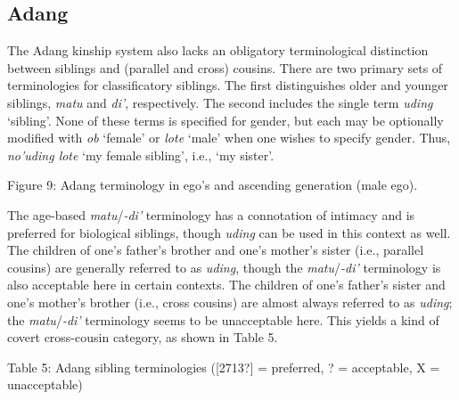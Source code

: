 \subsection[Adang]{Adang}
\hypertarget{RefHeading78025871885726}{}The Adang kinship system also lacks an obligatory terminological distinction between siblings and (parallel and cross) cousins. There are two primary sets of terminologies for classificatory siblings. The first distinguishes older and younger siblings, \textit{matu }and \textit{di{\textquoteright}}, respectively. The second includes the single term \textit{uding }{\textquoteleft}sibling{\textquoteright}. None of these terms is specified for gender, but each may be optionally modified with \textit{ob }{\textquoteleft}female{\textquoteright} or \textit{lote }{\textquoteleft}male{\textquoteright} when one wishes to specify gender. Thus, \textit{no{\textquoteright}uding lote} {\textquoteleft}my female sibling{\textquoteright}, i.e., {\textquoteleft}my sister{\textquoteright}. 

{\centering
Figure 9: Adang terminology in ego{\textquoteright}s and ascending generation (male ego). 
\par}

{%
 \par}

The age-based \textit{matu}/\textit{{}-di{\textquoteright} }terminology has a connotation of intimacy and is preferred for biological siblings, though \textit{uding }can be used in this context as well. The children of one{\textquoteright}s father{\textquoteright}s brother and one{\textquoteright}s mother{\textquoteright}s sister (i.e., parallel cousins) are generally referred to as \textit{uding}, though the \textit{matu}/\textit{{}-di{\textquoteright} }terminology is also acceptable here in certain contexts. The children of one{\textquoteright}s father{\textquoteright}s sister and one{\textquoteright}s mother{\textquoteright}s brother (i.e., cross cousins) are almost always referred to as \textit{uding}; the \textit{matu}/\textit{{}-di{\textquoteright} }terminology seems to be unacceptable here. This yields a kind of covert cross-cousin category, as shown in Table 5. 

{\centering
Table 5: Adang sibling terminologies ([2713?] = preferred, ? = acceptable, X = unacceptable)
\par}

